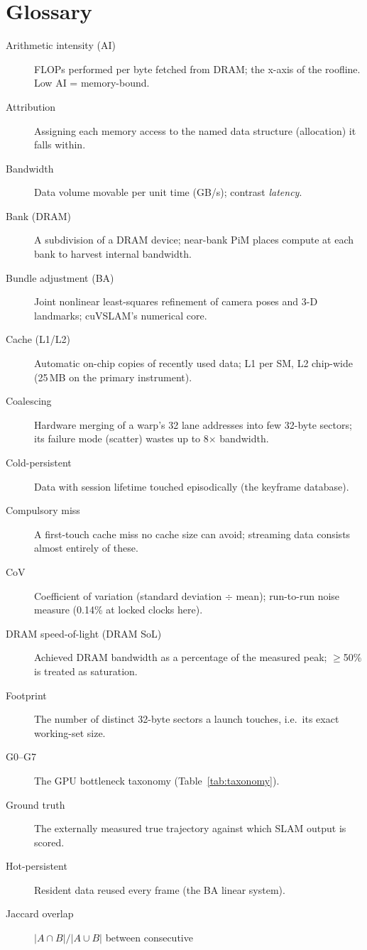 \chapter{Glossary}
\label{app:glossary}

\begin{description}
\item[Arithmetic intensity (AI)] FLOPs performed per byte fetched from
DRAM; the x-axis of the roofline. Low AI = memory-bound.
\item[Attribution] Assigning each memory access to the named data structure
(allocation) it falls within.
\item[Bandwidth] Data volume movable per unit time (GB/s); contrast
\emph{latency}.
\item[Bank (DRAM)] A subdivision of a DRAM device; near-bank PiM places
compute at each bank to harvest internal bandwidth.
\item[Bundle adjustment (BA)] Joint nonlinear least-squares refinement of
camera poses and 3-D landmarks; cuVSLAM's numerical core.
\item[Cache (L1/L2)] Automatic on-chip copies of recently used data; L1 per
SM, L2 chip-wide (25\,MB on the primary instrument).
\item[Coalescing] Hardware merging of a warp's 32 lane addresses into few
32-byte sectors; its failure mode (scatter) wastes up to 8$\times$
bandwidth.
\item[Cold-persistent] Data with session lifetime touched episodically
(the keyframe database).
\item[Compulsory miss] A first-touch cache miss no cache size can avoid;
streaming data consists almost entirely of these.
\item[CoV] Coefficient of variation (standard deviation $\div$ mean);
run-to-run noise measure (0.14\% at locked clocks here).
\item[DRAM speed-of-light (DRAM SoL)] Achieved DRAM bandwidth as a
percentage of the measured peak; $\geq$50\% is treated as saturation.
\item[Footprint] The number of distinct 32-byte sectors a launch touches,
i.e.\ its exact working-set size.
\item[G0--G7] The GPU bottleneck taxonomy (Table~\ref{tab:taxonomy}).
\item[Ground truth] The externally measured true trajectory against which
SLAM output is scored.
\item[Hot-persistent] Resident data reused every frame (the BA linear
system).
\item[Jaccard overlap] $|A \cap B| / |A \cup B|$ between consecutive

\end{description}
